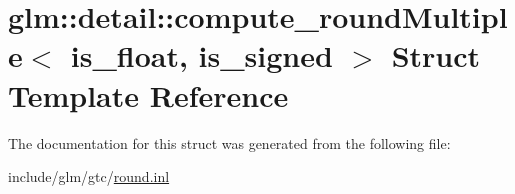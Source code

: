 \hypertarget{structglm_1_1detail_1_1compute__roundMultiple}{}\section{glm\+:\+:detail\+:\+:compute\+\_\+round\+Multiple$<$ is\+\_\+float, is\+\_\+signed $>$ Struct Template Reference}
\label{structglm_1_1detail_1_1compute__roundMultiple}


The documentation for this struct was generated from the following file\+:\begin{DoxyCompactItemize}
\item 
include/glm/gtc/\hyperlink{round_8inl}{round.\+inl}\end{DoxyCompactItemize}
